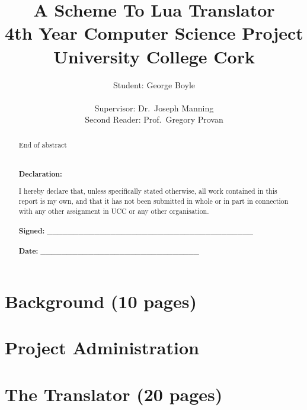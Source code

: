 \documentclass[twoside,a4paper,12pt]{report}
\begin{document}
%
%

\title{A Scheme To Lua Translator \\
{\small 4th Year Computer Science Project} \\
{\small University College Cork}}
\author{Student: George Boyle \\ \\
Supervisor: Dr.\ Joseph Manning \\
Second Reader: Prof.\ Gregory Provan}
\maketitle

\begin{abstract}
\lipsum[1]

End of abstract \\ \\ \\

\noindent\textbf{Declaration:}

I hereby declare that, unless specifically stated otherwise, all work contained
in this report is my own, and that it has not been submitted in whole or in part
in connection with any other assignment in UCC or any other organisation.
\\ \\

\noindent\textbf{Signed:}
\_\_\_\_\_\_\_\_\_\_\_\_\_\_\_\_\_\_\_\_\_\_\_\_\_\_\_\_\_\_\_\_\_\_\_\_\_\_\_
\\ \\
\noindent\textbf{Date:}
\_\_\_\_\_\_\_\_\_\_\_\_\_\_\_\_\_\_\_\_\_\_\_\_\_\_\_\_\_\_
\end{abstract}

\tableofcontents


%
%

\chapter{Background (10 pages)}

\lipsum[1-5]

\chapter{Project Administration}

\lipsum[6-10]

\chapter{The Translator (20 pages)}

\lipsum[11-20]
\end{document}
